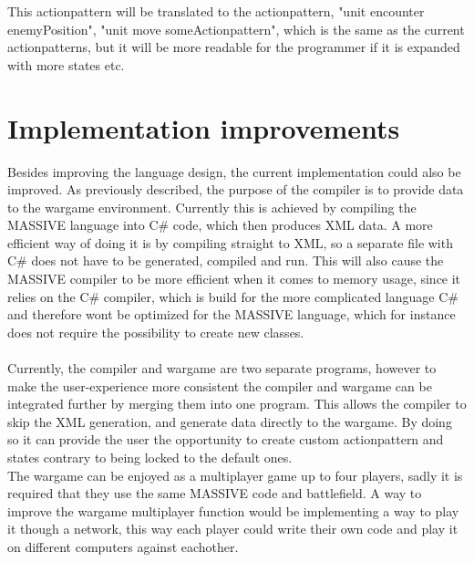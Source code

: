 This actionpattern will be translated to the actionpattern, "unit encounter enemyPosition", "unit move someActionpattern", which is the same as the current actionpatterns, but it will be more readable for the programmer if it is expanded with more states etc.


\section{Implementation improvements}
Besides improving the language design, the current implementation could also be improved. As previously described, the purpose of the compiler is to provide data to the wargame environment.
Currently this is achieved by compiling the MASSIVE language into C\# code, which then produces XML data. 
A more efficient way of doing it is by compiling straight to XML, so a separate file with C\# does not have to be generated, compiled and run. 
This will also cause the MASSIVE compiler to be more efficient when it comes to memory usage, since it relies on the C\# compiler, which is build for the more complicated language C\# and therefore wont be optimized for the MASSIVE language, which for instance does not require the possibility to create new classes.\\
 \\
Currently, the compiler and wargame are two separate programs, however to make the user-experience more consistent the compiler and wargame can be integrated further by merging them into one program.
This allows the compiler to skip the XML generation, and generate data directly to the wargame. By doing so it can provide the user the opportunity to create custom actionpattern and states contrary to being locked to the default ones.\newline
 \\
The wargame can be enjoyed as a multiplayer game up to four players, sadly it is required that they use the same MASSIVE code and battlefield. A way to improve the wargame multiplayer function would be implementing a way to play it though a network, this way each player could write their own code and play it on different computers against eachother.\\
\\
